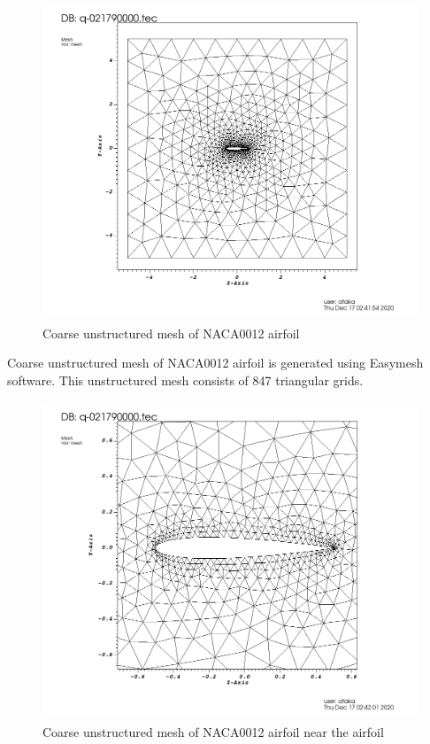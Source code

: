 \documentclass[letterpaper,12pt]{article}
\begin{document}
\begin{figure} [!h]
	\centering
	\includegraphics[height = 9.5cm]{graph/coarse/coarse_8470000.png}
	\caption{Coarse unstructured mesh of NACA0012 airfoil}
    \label{fig:airfoilmeshcoarse}
\end{figure}

\vspace{1cm}

Coarse unstructured mesh of NACA0012 airfoil is generated using Easymesh software. This 
unstructured mesh consists of 847 triangular grids.

\newpage

\begin{figure} [!h]
	\centering
	\includegraphics[height = 9.5cm]{graph/coarse/coarse_8470001.png}
	\caption{Coarse unstructured mesh of NACA0012 airfoil near the airfoil}
    \label{fig:airfoilmeshcoarseclose}
\end{figure}
\end{document}

